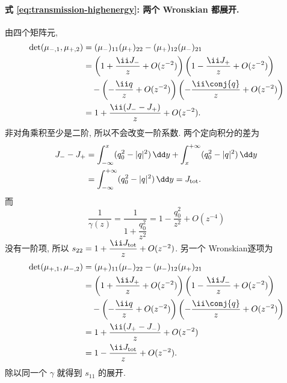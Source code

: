 \paragraph{式 \eqref{eq:transmission-highenergy}: 两个 Wronskian 都展开.}
由四个矩阵元,
\begin{align*}
\det(\mu_{-,1},\mu_{+,2})
&=(\mu_-)_{11}(\mu_+)_{22}-(\mu_+)_{12}(\mu_-)_{21}\\
&=\left(1+\dfrac{\ii J_-}{z}+O(z^{-2})\right)
\left(1-\dfrac{\ii J_+}{z}+O(z^{-2})\right)\\
&\quad-\left(-\dfrac{\ii q}{z}+O(z^{-2})\right)
\left(-\dfrac{\ii\conj{q}}{z}+O(z^{-2})\right)\\
&=1+\dfrac{\ii(J_--J_+)}{z}+O(z^{-2}).
\end{align*}
非对角乘积至少是二阶, 所以不会改变一阶系数.
两个定向积分的差为
\begin{align*}
J_--J_+
&=\int_{-\infty}^{x}(q_0^2-|q|^2)\,\dd y
+\int_x^{+\infty}(q_0^2-|q|^2)\,\dd y\\
&=\int_{-\infty}^{+\infty}(q_0^2-|q|^2)\,\dd y=J_{\rm tot}.
\end{align*}
而
\[
\dfrac{1}{\gamma(z)}
=\dfrac{1}{1+\dfrac{q_0^2}{z^2}}
=1-\dfrac{q_0^2}{z^2}+O(z^{-4})
\]
没有一阶项, 所以 $s_{22}=1+\dfrac{\ii J_{\rm tot}}{z}+O(z^{-2})$.
另一个 Wronskian逐项为
\begin{align*}
\det(\mu_{+,1},\mu_{-,2})
&=(\mu_+)_{11}(\mu_-)_{22}-(\mu_-)_{12}(\mu_+)_{21}\\
&=\left(1+\dfrac{\ii J_+}{z}+O(z^{-2})\right)
\left(1-\dfrac{\ii J_-}{z}+O(z^{-2})\right)\\
&\quad-\left(-\dfrac{\ii q}{z}+O(z^{-2})\right)
\left(-\dfrac{\ii\conj{q}}{z}+O(z^{-2})\right)\\
&=1+\dfrac{\ii(J_+-J_-)}{z}+O(z^{-2})\\
&=1-\dfrac{\ii J_{\rm tot}}{z}+O(z^{-2}).
\end{align*}
除以同一个 $\gamma$ 就得到 $s_{11}$ 的展开.

